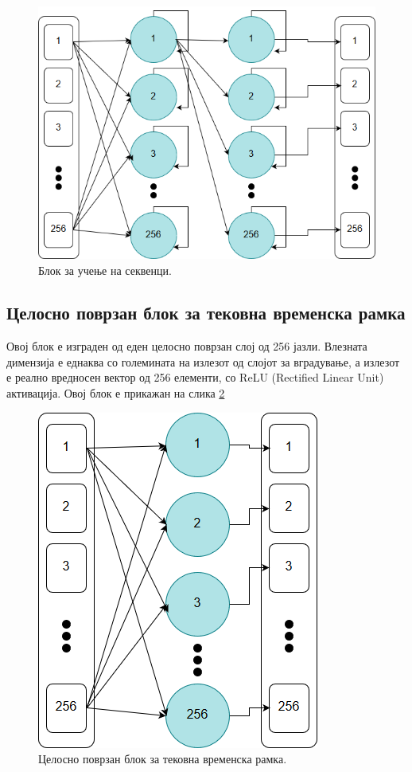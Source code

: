 \begin{figure}[H]
	\centering
    \includegraphics[scale=0.5]{images/lstm_block.png}
	\caption{Блок за учење на секвенци.}
	\label{fig:lstm_block}
\end{figure}

\subsection{Целосно поврзан блок за тековна временска рамка}

Овој блок е изграден од еден целосно поврзан слој од 256 јазли. Влезната димензија е еднаква со големината на излезот од слојот за вградување, а излезот е реално вредносен вектор од 256 елементи, со ReLU (Rectified Linear Unit) активација. Овој блок е прикажан на слика \ref{fig:fully_connected_block}

\begin{figure}[H]
	\centering
    \includegraphics[scale=0.5]{images/fully_connected.png}
	\caption{Целосно поврзан блок за тековна временска рамка.}
	\label{fig:fully_connected_block}
\end{figure}

